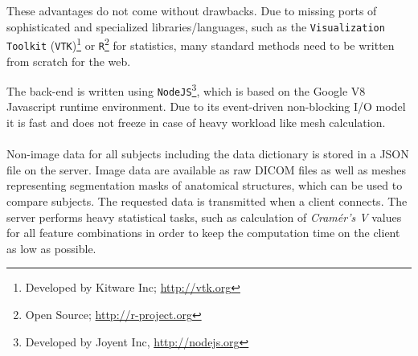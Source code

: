 \documentclass[journal]{style/vgtc} 			          %
\begin{document}
These advantages do not come without drawbacks.
%
Due to missing ports of sophisticated and specialized libraries/languages, such as the \texttt{Visualization Toolkit} (\texttt{VTK})\footnote{Developed by Kitware Inc; \url{http://vtk.org}} or \texttt{R}\footnote{Open Source; \url{http://r-project.org}} for statistics, many standard methods need to be written from scratch for the web.
%

The back-end is written using \texttt{NodeJS}\footnote{Developed by Joyent Inc, \url{http://nodejs.org}}, which is based on the Google V8 Javascript runtime environment.
%
Due to its event-driven non-blocking I/O model it is fast and does not freeze in case of heavy workload like mesh calculation.
\\\\
Non-image data for all subjects including the data dictionary is stored in a JSON file on the server.
%
Image data are available as raw DICOM files as well as meshes representing segmentation masks of anatomical structures, which can be used to compare subjects.
%
The requested data is transmitted when a client connects.
%
The server performs heavy statistical tasks, such as calculation of \emph{Cram\'{e}r's V} values for all feature combinations in order to keep the computation time on the client as low as possible.
%
\end{document}
